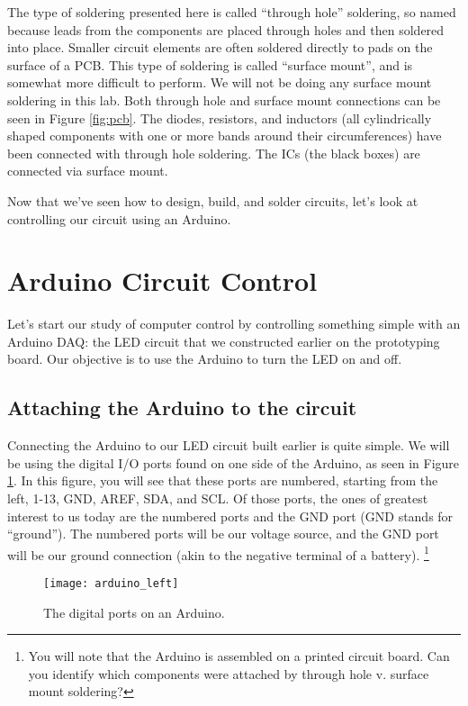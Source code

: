The type of soldering presented here is called ``through hole'' soldering, so 
named because leads from the components are placed through holes and then
soldered into place. Smaller circuit elements are often soldered directly to
pads on the surface of a PCB. This type of soldering is called ``surface
mount'', and is somewhat more difficult to perform. We will not be doing any
surface mount soldering in this lab. Both through hole and surface mount
connections can be seen in Figure \ref{fig:pcb}. The diodes, resistors, and
inductors (all cylindrically shaped components with one or more bands around 
their circumferences) have been connected with through hole soldering. The
ICs (the black boxes) are connected via surface mount.


Now that we've seen how to design, build, and solder circuits, let's look at
controlling our circuit using an Arduino.


\section{Arduino Circuit Control}

Let's start our study of computer control by controlling something simple
with an Arduino DAQ: the LED circuit that we constructed earlier on the
prototyping board. Our objective is to use the Arduino to turn the LED on and 
off. 

\subsection{Attaching the Arduino to the circuit}

Connecting the Arduino to our LED circuit built earlier is quite simple. We 
will be using the digital I/O ports found on one side of the Arduino, as 
seen in Figure \ref{fig:arduino_left}. In this figure, you will see that 
these ports are numbered, starting from the left, 1-13, GND, AREF, SDA, and
SCL. Of those ports, the ones of greatest interest to us today are the numbered
ports and the GND port (GND stands for ``ground''). The numbered ports will be
our voltage source, and the GND port will be our ground connection (akin to the
negative terminal of a battery).
\footnote{You will note that the
Arduino is assembled on a printed circuit board. Can you identify which 
components were attached by through hole v. surface mount soldering?}
\begin{figure}[hbp!]
\centering
\texttt{[image: arduino\_left]}
\caption[The digital ports on an Arduino]{The digital ports on an Arduino.}
\label{fig:arduino_left}
\end{figure}


